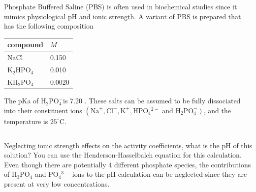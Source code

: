 \documentclass[12pt]{article}
\begin{document}
\section{}
Phosphate Buffered Saline (PBS) is often used in biochemical studies since it mimics physiological pH and ionic strength. A variant of PBS is prepared that has the following composition

\begin{center}
\begin{tabular}{|l|l|}
\hline
compound & $M$ \\
\hline
$\mathrm{NaCl}$ & 0.150 \\
\hline
$\mathrm{K}_{2} \mathrm{HPO}_{4}$ & 0.010 \\
\hline
$\mathrm{KH}_{2} \mathrm{PO}_{4}$ & 0.0020 \\
\hline
\end{tabular}
\end{center}

The pKa of $\mathrm{H}_{2} \mathrm{PO}_{4}^{-}$is 7.20 . These salts can be assumed to be fully dissociated into their constituent ions $\left(\mathrm{Na}^{+}, \mathrm{Cl}^{-}, \mathrm{K}^{+}, \mathrm{HPO}_{4}{ }^{2-}\right.$ and $\left.\mathrm{H}_{2} \mathrm{PO}_{4}^{-}\right)$, and the temperature is $25^{\circ} \mathrm{C}$.

\subsection{}
Neglecting ionic strength effects on the activity coefficients, what is the $\mathrm{pH}$ of this solution? You can use the Henderson-Hasselbalch equation for this calculation. Even though there are potentially 4 different phosphate species, the contributions of $\mathrm{H}_{3} \mathrm{PO}_{4}$ and $\mathrm{PO}_{4}{ }^{3-}$ ions to the $\mathrm{pH}$ calculation can be neglected since they are present at very low concentrations.
\end{document}
